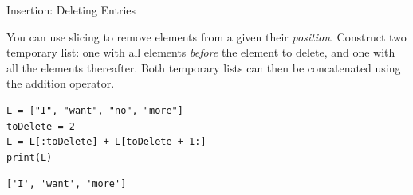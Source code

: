 
\begin{frame}[fragile]{Insertion: Deleting Entries}
%
\begin{hintbox}
You can use slicing to remove elements from a  given their \emph{position}. Construct two temporary list: one with all elements \emph{before} the element to delete, and one with all the elements thereafter. Both temporary lists can then be concatenated using the addition operator.
\end{hintbox}
%
\begin{tcbraster}[raster columns=2,
                  raster equal height,
                  nobeforeafter,
                  raster column skip=0.5cm]
\begin{codebox}
\begin{verbatim}
L = ["I", "want", "no", "more"]
toDelete = 2
L = L[:toDelete] + L[toDelete + 1:]
print(L)
\end{verbatim}
\end{codebox}
%
\begin{cmdbox}
\begin{verbatim}
['I', 'want', 'more']
\end{verbatim}
\end{cmdbox}
\end{tcbraster}
%
\end{frame}


